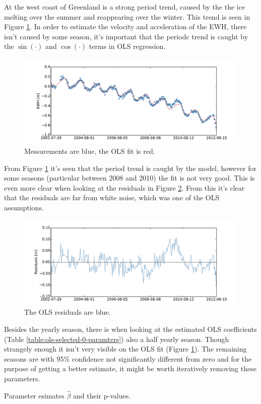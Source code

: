 At the west coast of Greenland is a strong period trend, caused by the the ice melting over the summer and reappearing over the winter. This trend is seen in Figure \ref{fig:ols-selected-0-fit}. In order to estimate the velocity and acceleration of the EWH, there isn't caused by some season, it's important that the periodc trend is caught by the $\sin(\cdot)$ and $\cos(\cdot)$ terms in OLS regression.
\begin{figure}[H]
	\centering
	\includegraphics[width=\textwidth]{figures/ols-selected-0-fit}
	\caption{Messurements are blue, the OLS fit is red.}
	\label{fig:ols-selected-0-fit}
\end{figure}
 
From Figure \ref{fig:ols-selected-0-fit} it's seen that the period trend is caught by the model, however for some seasons (particular between 2008 and 2010) the fit is not very good. This is even more clear when looking at the residuals in Figure \ref{fig:ols-selected-0-residual}. From this it's clear that the residuals are far from white noise, which was one of the OLS assumptions.
\begin{figure}[H]
	\centering
	\includegraphics[width=\textwidth]{figures/ols-selected-0-residual}
	\caption{The OLS residuals are blue.}
	\label{fig:ols-selected-0-residual}
\end{figure}

Besides the yearly season, there is when looking at the estimated OLS coefficients (Table \ref{table:ols-selected-0-paramters}) also a half yearly season. Though strangely enough it isn't very visible on the OLS fit (Figure \ref{fig:ols-selected-0-fit}). The remaining seasons are with 95\% confidence not significantly different from zero and for the purpose of getting a better estimate, it might be worth iteratively removing these parameters.
\begin{table}[H]
\centering
\centerline{}
\caption{Parameter esimates $\hat{\beta}$ and their p-values. }
\label{table:ols-selected-0-paramters}
\end{table}

